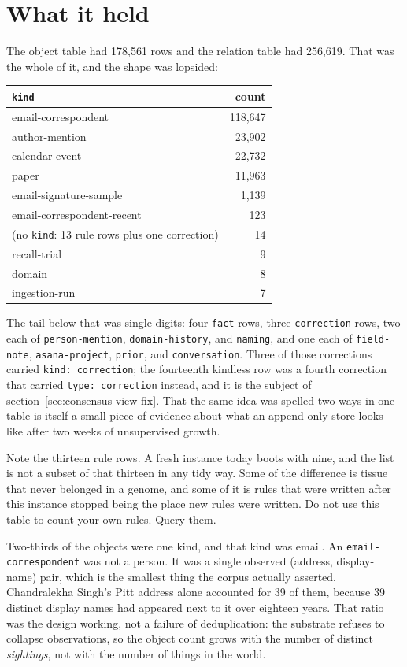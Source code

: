 \section{What it held}

The object table had 178{,}561 rows and the relation table had 256{,}619. That was the whole of it, and the shape was lopsided:

\begin{center}
\begin{tabular}{lr}
\toprule
\textbf{\texttt{kind}} & \textbf{count} \\
\midrule
email-correspondent & 118{,}647 \\
author-mention & 23{,}902 \\
calendar-event & 22{,}732 \\
paper & 11{,}963 \\
email-signature-sample & 1{,}139 \\
email-correspondent-recent & 123 \\
(no \texttt{kind}: 13 rule rows plus one correction) & 14 \\
recall-trial & 9 \\
domain & 8 \\
ingestion-run & 7 \\
\bottomrule
\end{tabular}
\end{center}

The tail below that was single digits: four \texttt{fact} rows, three \texttt{correction} rows, two each of \texttt{person-mention}, \texttt{domain-history}, and \texttt{naming}, and one each of \texttt{field-note}, \texttt{asana-project}, \texttt{prior}, and \texttt{conversation}. Three of those corrections carried \texttt{kind: correction}; the fourteenth kindless row was a fourth correction that carried \texttt{type: correction} instead, and it is the subject of section~\ref{sec:consensus-view-fix}. That the same idea was spelled two ways in one table is itself a small piece of evidence about what an append-only store looks like after two weeks of unsupervised growth.

Note the thirteen rule rows. A fresh instance today boots with nine, and the list is not a subset of that thirteen in any tidy way. Some of the difference is tissue that never belonged in a genome, and some of it is rules that were written after this instance stopped being the place new rules were written. Do not use this table to count your own rules. Query them.

Two-thirds of the objects were one kind, and that kind was email. An \texttt{email-correspondent} was not a person. It was a single observed (address, display-name) pair, which is the smallest thing the corpus actually asserted. Chandralekha Singh's Pitt address alone accounted for 39 of them, because 39 distinct display names had appeared next to it over eighteen years. That ratio was the design working, not a failure of deduplication: the substrate refuses to collapse observations, so the object count grows with the number of distinct \emph{sightings}, not with the number of things in the world.

